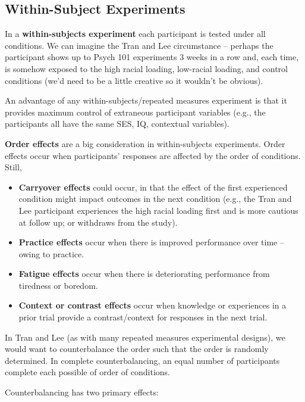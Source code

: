 \documentclass[
  english,
]{book}
\providecommand{\tightlist}{%
  \setlength{\itemsep}{0pt}\setlength{\parskip}{0pt}}
\begin{document}
\hypertarget{within-subject-experiments}{%
\subsection{Within-Subject Experiments}\label{within-subject-experiments}}

In a \textbf{within-subjects experiment} each participant is tested under all conditions. We can imagine the Tran and Lee \citeyearpar{tran_you_2014} circumstance -- perhaps the participant shows up to Psych 101 experiments 3 weeks in a row and, each time, is somehow exposed to the high racial loading, low-racial loading, and control conditions (we'd need to be a little creative so it wouldn't be obvious).

An advantage of any within-subjects/repeated measures experiment is that it provides maximum control of extraneous participant variables (e.g., the participants all have the same SES, IQ, contextual variables).

\textbf{Order effects} are a big consideration in within-subjects experiments. Order effects occur when participants' responses are affected by the order of conditions. Still,

\begin{itemize}
\tightlist
\item
  \textbf{Carryover effects} could occur, in that the effect of the first experienced condition might impact outcomes in the next condition (e.g., the Tran and Lee participant experiences the high racial loading first and is more cautious at follow up; or withdraws from the study).
\item
  \textbf{Practice effects} occur when there is improved performance over time -- owing to practice.
\item
  \textbf{Fatigue effects} occur when there is deteriorating performance from tiredness or boredom.
\item
  \textbf{Context or contrast effects} occur when knowledge or experiences in a prior trial provide a contrast/context for responses in the next trial.
\end{itemize}

In Tran and Lee (as with many repeated measures experimental designs), we would want to counterbalance the order such that the order is randomly determined. In complete counterbalancing, an equal number of participants complete each possible of order of conditions.

Counterbalancing has two primary effects:
\end{document}

